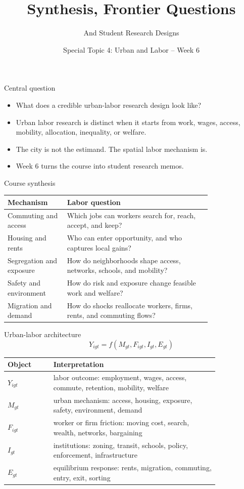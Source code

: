 \documentclass[aspectratio=169,11pt]{beamer}
\title{Synthesis, Frontier Questions}
\subtitle{And Student Research Designs}
\author{Special Topic 4: Urban and Labor -- Week 6}
\date{}
\begin{document}
\begin{frame}
  \titlepage
\end{frame}

\begin{frame}{Central question}
\begin{itemize}
    \item What does a credible urban-labor research design look like?
    \item Urban labor research is distinct when it starts from work, wages, access, mobility, allocation, inequality, or welfare.
    \item The city is not the estimand. The spatial labor mechanism is.
    \item Week 6 turns the course into student research memos.
\end{itemize}
\end{frame}

\begin{frame}{Course synthesis}
\small
\begin{tabular}{p{0.23\linewidth} p{0.57\linewidth}}
\toprule
Mechanism & Labor question \\
\midrule
Commuting and access & Which jobs can workers search for, reach, accept, and keep? \\
Housing and rents & Who can enter opportunity, and who captures local gains? \\
Segregation and exposure & How do neighborhoods shape access, networks, schools, and mobility? \\
Safety and environment & How do risk and exposure change feasible work and welfare? \\
Migration and demand & How do shocks reallocate workers, firms, rents, and commuting flows? \\
\bottomrule
\end{tabular}
\end{frame}

\begin{frame}{Urban-labor architecture}
\[
Y_{igt}
=
f\left(M_{gt}, F_{igt}, I_{gt}, E_{gt}\right)
\]
\small
\begin{tabular}{p{0.18\linewidth} p{0.65\linewidth}}
\toprule
Object & Interpretation \\
\midrule
$Y_{igt}$ & labor outcome: employment, wages, access, commute, retention, mobility, welfare \\
$M_{gt}$ & urban mechanism: access, housing, exposure, safety, environment, demand \\
$F_{igt}$ & worker or firm friction: moving cost, search, wealth, networks, bargaining \\
$I_{gt}$ & institutions: zoning, transit, schools, policy, enforcement, infrastructure \\
$E_{gt}$ & equilibrium response: rents, migration, commuting, entry, exit, sorting \\
\bottomrule
\end{tabular}
\end{frame}
\end{document}
